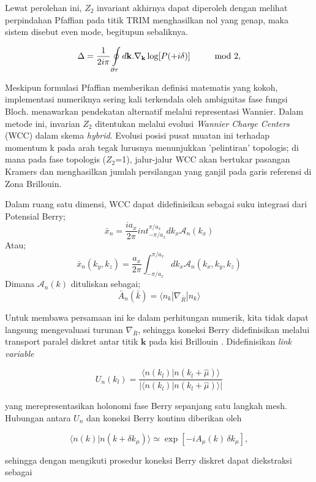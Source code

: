 Lewat perolehan ini, $Z_2$ invariant akhirnya dapat diperoleh dengan melihat perpindahan Pfaffian pada titik TRIM menghasilkan nol yang genap, maka sistem disebut even mode, begitupun sebaliknya.

\[
  \Delta = \frac{1}{2i\pi}\ointop_{\partial\tau} d\mathbf{k}.\nabla_{\mathbf{k}} \log [P(\mathbf + i\delta)] \hspace{1 cm} \text{mod 2},
  \]
\par
Meskipun formulasi Pfaffian memberikan definisi matematis yang kokoh, implementasi numeriknya sering kali terkendala oleh ambiguitas fase fungsi Bloch. \parencite{PhysRevB.83.035108} menawarkan pendekatan alternatif melalui representasi Wannier. Dalam metode ini, invarian $Z_2$ ditentukan melalui evolusi \textit{Wannier Charge Centers} (WCC) dalam skema \textit{hybrid}. Evolusi posisi pusat muatan ini terhadap momentum k pada arah tegak lurusnya menunjukkan 'pelintiran' topologis; di mana pada fase topologis ($Z_2$=1), jalur-jalur WCC akan bertukar pasangan Kramers dan menghasilkan jumlah persilangan yang ganjil pada garis referensi di Zona Brillouin.
\par
Dalam ruang satu dimensi, WCC dapat didefinisikan sebagai suku integrasi dari Potensial Berry\parencite{10.1098/rspa.1984.0023}\parencite{PhysRevB.95.075146};
\[
  \bar{x}_n = \frac{ia_x}{2\pi} int_{-\pi / a_x}^{\pi / a_x} dk_x \mathcal{A}_n (k_x)
\]
Atau;
\[
  \bar{x}_n(k_y, k_z) = \frac{a_x}{2\pi} \int_{-\pi / a_x}^{\pi / a_x} dk_x \mathcal{A}_n (k_x, k_y, k_z)

  \]
Dimana $\mathcal{A}_n(k)$ dituliskan sebagai; \[ \bar{A}_n (\bar{k}) =  \langle n_k | \nabla_{\bar{R}} | n_k \rangle \]
\par
Untuk membawa persamaan ini ke dalam perhitungan numerik, 
kita tidak dapat langsung mengevaluasi turunan 
$\nabla_{\bar{R}}$, sehingga koneksi Berry 
didefinisikan melalui transport paralel diskret antar titik 
$\mathbf{k}$ pada kisi Brillouin \parencite{doi:10.1143/JPSJ.74.1674}. 
Didefinisikan \textit{link variable}

\[
U_n(k_l) 
= \frac{\langle n(k_l) | n(k_l+\hat{\mu}) \rangle}
{|\langle n(k_l) | n(k_l+\hat{\mu}) \rangle|}
\]

yang merepresentasikan holonomi fase Berry sepanjang satu 
langkah mesh. Hubungan antara $U_n$ dan koneksi Berry kontinu 
diberikan oleh

\[
\langle n(k) | n(k+\delta k_\mu) \rangle 
\simeq \exp\!\left[-i A_\mu(k)\,\delta k_\mu \right],
\]

sehingga dengan mengikuti prosedur \parencite{Cole_Python_Tight_Binding_2025} koneksi Berry diskret dapat diekstraksi sebagai

